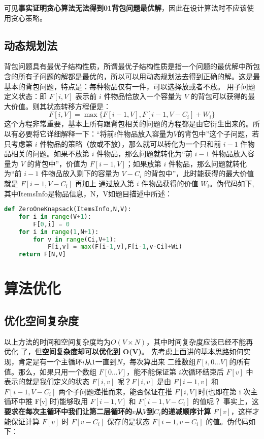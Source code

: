 可见\textbf{事实证明贪心算法无法得到01背包问题最优解}，因此在设计算法时不应该使用贪心策略。

\subsection{动态规划法}
背包问题具有最优子结构性质，所谓最优子结构性质是指一个问题的最优解中所包含的所有子问题的解都是最优的，所以可以用动态规划法去得到正确的解。这是最基本的背包问题，特点是：每种物品仅有一件，可以选择放或者不放。
用子问题定义状态：即 $F[i, V]$ 表示前 $i$ 件物品恰放入一个容量为 $V$ 的背包可以获得的最大价值。则其状态转移方程便是：
$$
F[i, V] = \max{\{F[i-1, V], F[i-1, V-C_i] + W_i\}}
$$
这个方程非常重要，基本上所有跟背包相关的问题的方程都是由它衍生出来的。所
以有必要将它详细解释一下：“将前$i$件物品放入容量为$V$的背包中”这个子问题，若只考虑第 $i$ 件物品的策略（放或不放），那么就可以转化为一个只和前 $i-1$ 件物品相关的问题。如果不放第 $i$ 件物品，那么问题就转化为“前 $i-1$ 件物品放入容量为 $V$ 的背包中”，价值为 $F[i-1, V]$；如果放第 $i$ 件物品，那么问题就转化为“前 $i-1$ 件物品放入剩下的容量为 $V-C_i$ 的背包中”，此时能获得的最大价值就是 $F[i-1, V-C_i]$ 再加上
通过放入第 $i$ 件物品获得的价值 $W_i$。伪代码如下,其中ItemsInfo是物品信息，N，V如题目描述中所述：

\begin{lstlisting}[language=python, caption = 伪代码实现--ZeroOneKnapsack]
def ZeroOneKnapsack(ItemsInfo,N,V):
    for i in range(V+1):
        F[0,i] = 0
    for i in range(1,N+1):
        for v in range(Ci,V+1):
            F[i,v] = max(F[i-1,v],F[i-1,v-Ci]+Wi) 
    return F[N,V]
\end{lstlisting}

\section{算法优化}
\subsection{优化空间复杂度}
以上方法的时间和空间复杂度均为$O(V \times N)$，其中时间复杂度应该已经不能再优化
了，但\textbf{空间复杂度却可以优化到 O(V)}。
先考虑上面讲的基本思路如何实现，肯定是有一个主循环$i$从$1$一直到$N$，每次算出来
二维数组$F[i, 0...V]$的所有值。那么，如果只用一个数组 $F[0...V]$，能不能保证第 $i$次循环结束后 $F[v]$ 中表示的就是我们定义的状态 $F[i, v]$ 呢？$F[i, v]$ 是由 $F[i-1, v]$ 和$F[i-1, V-C_i]$ 两个子问题递推而来，能否保证在推 $F[i, V]$时(也即在第 i 次主循环中推 F[v] 时)能够取用 $F[i-1, V]$ 和 $F[i-1, V-C_i]$ 的值呢？
事实上，这\textbf{要求在每次主循环中我们让第二层循环的$v$从$V$到$C_i$的递减顺序计算 $F[v]$}，这样才能保证计算 $F[v]$ 时 $F[v-C_i]$ 保存的是状态 $F[i-1,v-C_i]$ 的值。伪代码如下：

